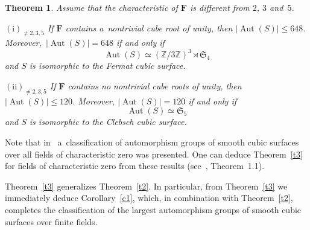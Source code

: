 \documentclass{amsart}
\numberwithin{equation}{section}
\theoremstyle{plain}
\newtheorem{theorem}{Theorem}
\theoremstyle{definition}
\theoremstyle{remark}
\begin{document}
\begin{theorem}
\goodbreak

Assume that the characteristic of $\mathbf{F}$ is different from $2$, $3$ and~$5$.

$(\mathrm{i})_{\neq 2,3,5}$ If\/ $\mathbf{F}$ contains a~nontrivial cube root of unity, then $|{\operatorname{Aut}(S)}| \leqslant 648$. Moreover,~$|{\operatorname{Aut}(S)}| = 648$ if and only if
$$
\operatorname{Aut}(S) \simeq (\mathbb{Z}/3\mathbb{Z})^3 \rtimes \mathfrak{S}_4
$$
and $S$ is isomorphic to the Fermat cubic surface.

$(\mathrm{ii})_{\neq 2,3,5}$ If\/ $\mathbf{F}$ contains no nontrivial cube roots of unity, then $|{\operatorname{Aut}(S)}| \leqslant 120$. Moreover, $|{\operatorname{Aut}(S)}| = 120$ if and only if
$$
\operatorname{Aut}(S) \simeq \mathfrak{S}_5
$$
and $S$ is isomorphic to the Clebsch cubic surface.
\end{theorem}

Note that in~\cite{16} a~classification of automorphism groups of smooth cubic surfaces over all fields of characteristic zero was presented. One can deduce Theorem~\ref{t3} for fields of characteristic zero from these results (see~\cite{16}, Theorem~1.1).

Theorem~\ref{t3} generalizes Theorem~\ref{t2}. In particular, from Theorem~\ref{t3} we immediately deduce Corollary~\ref{c1}, which, in combination with Theorem~\ref{t2}, completes the classification of the largest automorphism groups of smooth cubic surfaces over finite fields.
\end{document}
